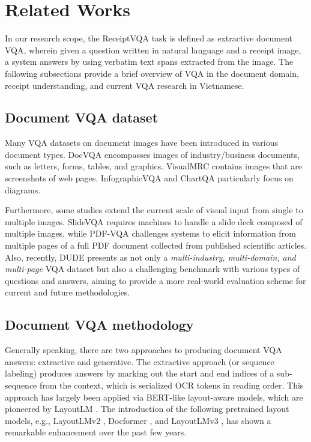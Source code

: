 \section{Related Works}
\label{sec:RelatedWorks}

In our research scope, the ReceiptVQA task is defined as extractive document VQA, wherein given a question written in natural language and a receipt image, a system answers by using verbatim text spans extracted from the image. The following subsections provide a brief overview of VQA in the document domain, receipt understanding, and current VQA research in Vietnamese. 


\subsection{Document VQA dataset} \label{sec:rel_docvqa_data}

Many VQA datasets on document images have been introduced in various document types. DocVQA \cite{mathew2021docvqa} encompasses images of industry/business documents, such as letters, forms, tables, and graphics. VisualMRC \cite{tanaka2021visualmrc} contains images that are screenshots of web pages. InfographicVQA \cite{InfographicVQA} and ChartQA \cite{masry2022chartqa} particularly focus on diagrams.

Furthermore, some studies extend the current scale of visual input from single to multiple images. SlideVQA \cite{SlideVQA2023} requires machines to handle a slide deck composed of multiple images, while PDF-VQA \cite{pdfvqa} challenges systems to elicit information from multiple pages of a full PDF document collected from published scientific articles. Also, recently, DUDE \cite{dude} presents as not only a \textit{multi-industry, multi-domain, and multi-page} VQA dataset but also a challenging benchmark with various types of questions and answers, aiming to provide a more real-world evaluation scheme for current and future methodologies.

\subsection{Document VQA methodology} \label{sec:rel_docvqa_med}

Generally speaking, there are two approaches to producing document VQA answers: extractive and generative. The extractive approach (or sequence labeling) produces answers by marking out the start and end indices of a sub-sequence from the context, which is serialized OCR tokens in reading order. This approach has largely been applied via BERT-like layout-aware models, which are pioneered by LayoutLM \cite{LayoutLM}. The introduction of the following pretrained layout models, e.g., LayoutLMv2 \cite{layoutlmv2}, Docformer \cite{docformer}, and LayoutLMv3 \cite{layoutlmv3}, has shown a remarkable enhancement over the past few years.

